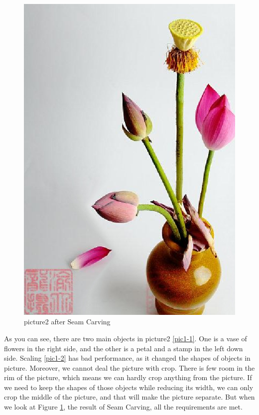 \documentclass[final]{cvpr}
\begin{document}
\begin{figure}
\begin{center}
    \includegraphics[scale=0.15]{pics/1-3.png}
    \caption{picture2 after Seam Carving}
    \label{pic1-3} 
\end{center}
\end{figure}

As you can see, there are two main objects in picture2 \ref{pic1-1}. One is a vase of flowers in the right side, and the other is a petal and a stamp in the left down side. Scaling \ref{pic1-2} has bad performance, as it changed the shapes of objects in picture. Moreover, we cannot deal the picture with crop. There is few room in the rim of the picture, which means we can hardly crop anything from the picture. If we need to keep the shapes of those objects while reducing its width, we can only crop the middle of the picture, and that will make the picture separate. But when we look at Figure \ref{pic1-3}, the result of Seam Carving, all the requirements are met. 
\end{document}
